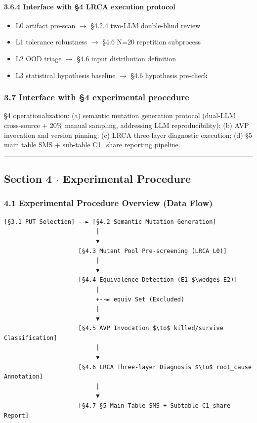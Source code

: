 \documentclass[review,12pt,authoryear]{elsarticle}
\providecommand{\tightlist}{\setlength{\itemsep}{0pt}\setlength{\parskip}{0pt}}
\begin{document}
\paragraph{3.6.4 Interface with §4 LRCA execution
protocol}\label{interface-with-4-lrca-execution-protocol}

\begin{itemize}
\tightlist
\item
  L0 artifact pre-scan $\to$ §4.2.4 two-LLM double-blind review
\item
  L1 tolerance robustness $\to$ §4.6 N=20 repetition subprocess
\item
  L2 OOD triage $\to$ §4.6 input distribution definition
\item
  L3 statistical hypothesis baseline $\to$ §4.6 hypothesis pre-check
\end{itemize}

\subsubsection{3.7 Interface with §4 experimental
procedure}\label{interface-with-4-experimental-procedure}

§4 operationalization: (a) semantic mutation generation protocol
(dual-LLM cross-source + 20\% manual sampling, addressing LLM
reproducibility); (b) AVP invocation and version pinning; (c) LRCA
three-layer diagnostic execution; (d) §5 main table SMS + sub-table
C1\_share reporting pipeline.

\begin{center}\rule{0.5\linewidth}{0.5pt}\end{center}

\subsection{Section 4 $\cdot$ Experimental
Procedure}\label{section-4-experimental-procedure}

\subsubsection{4.1 Experimental Procedure Overview (Data
Flow)}\label{experimental-procedure-overview-data-flow}

\begin{verbatim}
[§3.1 PUT Selection] --► [§4.2 Semantic Mutation Generation]
                          |
                          ▼
                     [§4.3 Mutant Pool Pre-screening (LRCA L0)]
                          |
                          ▼
                     [§4.4 Equivalence Detection (E1 $\wedge$ E2)]
                          |
                          +--► equiv Set (Excluded)
                          |
                          ▼
                     [§4.5 AVP Invocation $\to$ killed/survive Classification]
                          |
                          ▼
                     [§4.6 LRCA Three-layer Diagnosis $\to$ root_cause Annotation]
                          |
                          ▼
                     [§4.7 §5 Main Table SMS + Subtable C1_share Report]
\end{verbatim}
\end{document}
